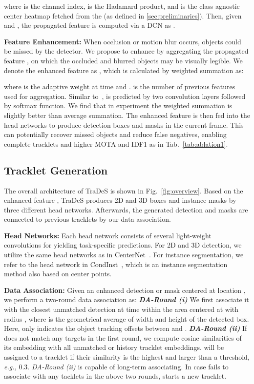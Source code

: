 \documentclass[final]{cvpr}
\newcommand{\myparagraph}[1]{{\vspace{0.5em} \noindent \bf #1}}
\begin{document}
where  is the channel index,   is the Hadamard product, and  is the class agnostic center heatmap fetched from the  (as defined in \cref{sec:preliminaries}). Then, given  and , the propagated feature is computed via a DCN as .

\myparagraph{Feature Enhancement:} When occlusion or motion blur occurs, objects could be missed by the detector. We propose to enhance  by aggregating the propagated feature , on which the occluded and blurred objects may be visually legible. We denote the enhanced feature as , which is calculated by weighted summation as:
\vspace{-2mm}

where  is the adaptive weight at time  and .  is the number of previous features used for aggregation. Similar to~\cite{liu2019learning},  is predicted by two convolution layers followed by softmax function. We find that in experiment the weighted summation is slightly better than average summation. The enhanced feature  is then fed into the head networks to produce detection boxes and masks in the current frame. This can potentially recover missed objects and reduce false negatives, enabling complete tracklets and higher MOTA and IDF1 as in Tab.~\ref{tab:ablation1}.
\vspace{-3mm}

\subsection{Tracklet Generation}
\vspace{-1mm}
\label{subsec:tracklet_generation}
The overall architecture of TraDeS is shown in Fig.~\ref{fig:overview}. Based on the enhanced feature , TraDeS produces 2D and 3D boxes and instance masks by three different head networks. Afterwards, the generated detection and masks are connected to previous tracklets by our data association.

\myparagraph{Head Networks:} 
Each head network consists of several light-weight convolutions for yielding task-specific predictions. For 2D and 3D detection, we utilize the same head networks as in CenterNet~\cite{zhou2019objects}. For instance segmentation, we refer to the head network in CondInst~\cite{tian2020conditional}, which is an instance segmentation method also based on center points.

\myparagraph{Data Association:}
Given an enhanced detection or mask  centered at location , we perform a two-round data association as: \textbf{\emph{DA-Round (i)}} We first associate it with the closest unmatched detection at time  within the area centered at  with radius , where  is the geometrical average of width and height of the detected box. Here,  only indicates the object tracking offsets between  and . \textbf{\emph{DA-Round (ii)}} If  does not match any targets in the first round, we compute cosine similarities of its embedding  with all unmatched or history tracklet embeddings.  will be assigned to a tracklet if their similarity is the highest and larger than a threshold, \emph{e.g.,} 0.3. \emph{DA-Round (ii)} is capable of long-term associating. In case  fails to associate with any tacklets in the above two rounds,  starts a new tracklet.
\end{document}
